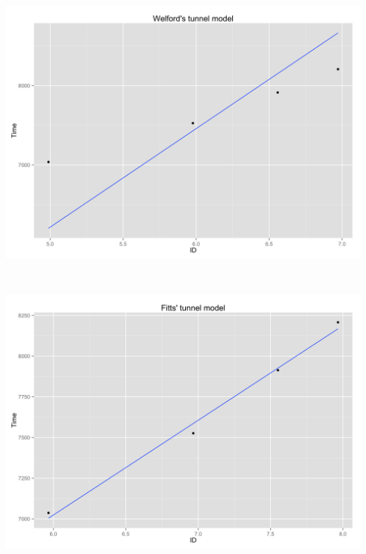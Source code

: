 \begin{minipage}{\linewidth}
	\begin{minipage}[t]{.45\linewidth}
		\includegraphics[width=\textwidth]{images/plots/plot_model_tunnel_welford}
		\label{fig:welford_tunnel_line}
	\end{minipage}
	\begin{minipage}[b]{0.1\linewidth}
	~
	\end{minipage}
	\begin{minipage}[t]{0.45\linewidth}
		\includegraphics[width=\textwidth]{images/plots/plot_model_tunnel_fitt}
		\label{fig:fitt_tunnel_line}
	\end{minipage}
\end{minipage}
